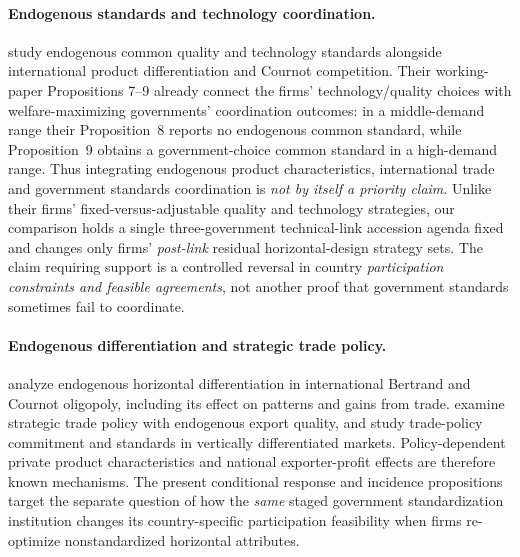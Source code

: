 \paragraph{Endogenous standards and technology coordination.}
\citet{LambertiniRossini1998} study endogenous
common quality and technology standards alongside
international product differentiation and Cournot
competition. Their working-paper Propositions 7--9
already connect the firms' technology/quality choices
with welfare-maximizing governments' coordination
outcomes: in a middle-demand range their Proposition~8
reports no endogenous common standard, while
Proposition~9 obtains a government-choice common
standard in a high-demand range. Thus integrating
endogenous product characteristics, international
trade and government standards coordination is
\emph{not by itself a priority claim}.
Unlike their firms' fixed-versus-adjustable quality
and technology strategies, our comparison holds
a single three-government technical-link accession
agenda fixed and changes only firms' \emph{post-link}
residual horizontal-design strategy sets. The claim
requiring support is a controlled reversal in country
\emph{participation constraints and feasible
agreements}, not another proof that government
standards sometimes fail to coordinate.

\paragraph{Endogenous differentiation and strategic trade policy.}
\citet{BranderSpencer2015} analyze endogenous
horizontal differentiation in international
Bertrand and Cournot oligopoly, including its
effect on patterns and gains from trade.
\citet{ZhouSpencerVertinsky2002} examine
strategic trade policy with endogenous export
quality, and \citet{JeanneretVerdier1996}
study trade-policy commitment and standards
in vertically differentiated markets.
Policy-dependent private product characteristics
and national exporter-profit effects are
therefore known mechanisms. The present
conditional response and incidence propositions
target the separate question of how the
\emph{same} staged government standardization
institution changes its country-specific
participation feasibility when firms
re-optimize nonstandardized horizontal attributes.

